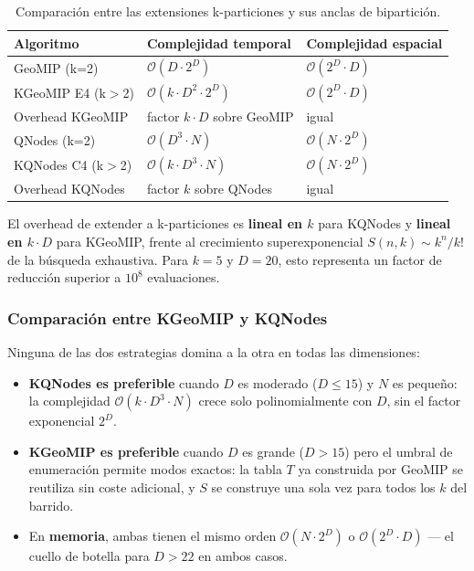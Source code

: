 \begin{table}[H]
  \centering
  \caption{Comparación entre las extensiones k-particiones y sus anclas de bipartición.}
  \label{tab:comparacion_biparticion}
  \begin{tabular}{lll}
    \toprule
    \textbf{Algoritmo} & \textbf{Complejidad temporal} & \textbf{Complejidad espacial} \\
    \midrule
    GeoMIP (k=2)        & $\mathcal{O}(D \cdot 2^D)$         & $\mathcal{O}(2^D \cdot D)$ \\
    KGeoMIP E4 (k$>$2)  & $\mathcal{O}(k \cdot D^2 \cdot 2^D)$ & $\mathcal{O}(2^D \cdot D)$ \\
    Overhead KGeoMIP    & factor $k \cdot D$ sobre GeoMIP    & igual \\[3pt]
    QNodes (k=2)        & $\mathcal{O}(D^3 \cdot N)$         & $\mathcal{O}(N \cdot 2^D)$ \\
    KQNodes C4 (k$>$2)  & $\mathcal{O}(k \cdot D^3 \cdot N)$ & $\mathcal{O}(N \cdot 2^D)$ \\
    Overhead KQNodes    & factor $k$ sobre QNodes            & igual \\
    \bottomrule
  \end{tabular}
\end{table}

El overhead de extender a k-particiones es \textbf{lineal en $k$} para KQNodes y
\textbf{lineal en $k \cdot D$} para KGeoMIP, frente al crecimiento superexponencial
$S(n,k) \sim k^n / k!$ de la búsqueda exhaustiva. Para $k = 5$ y $D = 20$, esto
representa un factor de reducción superior a $10^8$ evaluaciones.

\subsubsection*{Comparación entre KGeoMIP y KQNodes}

Ninguna de las dos estrategias domina a la otra en todas las dimensiones:

\begin{itemize}
  \item \textbf{KQNodes es preferible} cuando $D$ es moderado ($D \leq 15$) y
        $N$ es pequeño: la complejidad $\mathcal{O}(k \cdot D^3 \cdot N)$ crece solo
        polinomialmente con $D$, sin el factor exponencial $2^D$.

  \item \textbf{KGeoMIP es preferible} cuando $D$ es grande ($D > 15$) pero el
        umbral de enumeración permite modos exactos: la tabla $T$ ya construida por
        GeoMIP se reutiliza sin coste adicional, y $S$ se construye una sola vez
        para todos los $k$ del barrido.

  \item En \textbf{memoria}, ambas tienen el mismo orden $\mathcal{O}(N \cdot 2^D)$
        o $\mathcal{O}(2^D \cdot D)$ — el cuello de botella para $D > 22$ en ambos casos.
\end{itemize}
